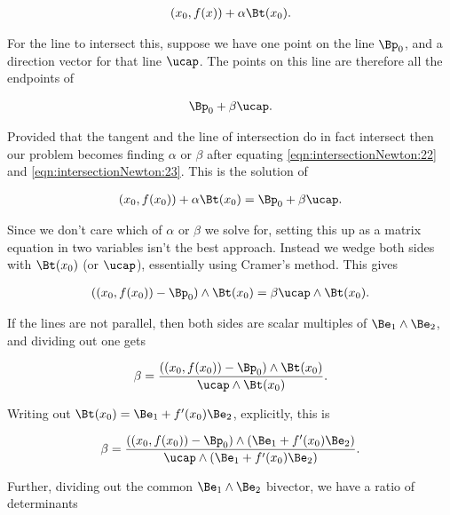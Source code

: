 \begin{align}\label{eqn:intersectionNewton:22}
(x_0, f(x)) + \alpha \Bt(x_0).
\end{align}

For the line to intersect this, suppose we have one point on the line $\Bp_0$, and a direction vector for that line $\ucap$.  The points on this line are therefore all the endpoints of 

\begin{align}\label{eqn:intersectionNewton:23}
\Bp_0 + \beta \ucap.
\end{align}

Provided that the tangent and the line of intersection do in fact intersect then our problem becomes finding $\alpha$ or $\beta$ after equating \ref{eqn:intersectionNewton:22} and \ref{eqn:intersectionNewton:23}.  This is the solution of

\begin{align}\label{eqn:intersectionNewton:24}
(x_0, f(x_0)) + \alpha \Bt(x_0) = \Bp_0 + \beta \ucap.
\end{align}

Since we don't care which of $\alpha$ or $\beta$ we solve for, setting this up as a matrix equation in two variables isn't the best approach.  Instead we wedge both sides with $\Bt(x_0)$ (or $\ucap$), essentially using Cramer's method.  This gives 

\begin{align}\label{eqn:intersectionNewton:25}
\left((x_0, f(x_0)) -\Bp_0 \right) \wedge \Bt(x_0) = \beta \ucap \wedge \Bt(x_0).
\end{align}

If the lines are not parallel, then both sides are scalar multiples of $\Be_1 \wedge \Be_2$, and dividing out one gets

\begin{align}\label{eqn:intersectionNewton:26}
\beta = \frac{\left((x_0, f(x_0)) -\Bp_0 \right) \wedge \Bt(x_0)}{\ucap \wedge \Bt(x_0)}.
\end{align}

Writing out $\Bt(x_0) = \Be_1 + f'(x_0) \Be_2$, explicitly, this is

\begin{align}\label{eqn:intersectionNewton:26b}
\beta = \frac{\left((x_0, f(x_0)) -\Bp_0 \right) \wedge \left(\Be_1 + f'(x_0) \Be_2\right)}{\ucap \wedge \left(\Be_1 + f'(x_0) \Be_2\right)}.
\end{align}

Further, dividing out the common $\Be_1 \wedge \Be_2$ bivector, we have a ratio of determinants

